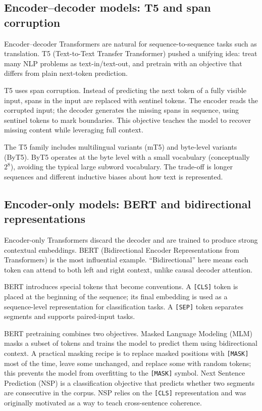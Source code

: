 \subsection{Encoder--decoder models: T5 and span corruption}
Encoder--decoder Transformers are natural for sequence-to-sequence tasks such as translation. T5 (Text-to-Text Transfer Transformer) pushed a unifying idea: treat many NLP problems as text-in/text-out, and pretrain with an objective that differs from plain next-token prediction.

T5 uses span corruption. Instead of predicting the next token of a fully visible input, spans in the input are replaced with sentinel tokens. The encoder reads the corrupted input; the decoder generates the missing spans in sequence, using sentinel tokens to mark boundaries. This objective teaches the model to recover missing content while leveraging full context.

The T5 family includes multilingual variants (mT5) and byte-level variants (ByT5). ByT5 operates at the byte level with a small vocabulary (conceptually \(2^8\)), avoiding the typical large subword vocabulary. The trade-off is longer sequences and different inductive biases about how text is represented.

\subsection{Encoder-only models: BERT and bidirectional representations}
Encoder-only Transformers discard the decoder and are trained to produce strong contextual embeddings. BERT (Bidirectional Encoder Representations from Transformers) is the most influential example. “Bidirectional” here means each token can attend to both left and right context, unlike causal decoder attention.

BERT introduces special tokens that become conventions. A \texttt{[CLS]} token is placed at the beginning of the sequence; its final embedding is used as a sequence-level representation for classification tasks. A \texttt{[SEP]} token separates segments and supports paired-input tasks.

BERT pretraining combines two objectives. Masked Language Modeling (MLM) masks a subset of tokens and trains the model to predict them using bidirectional context. A practical masking recipe is to replace masked positions with \texttt{[MASK]} most of the time, leave some unchanged, and replace some with random tokens; this prevents the model from overfitting to the \texttt{[MASK]} symbol. Next Sentence Prediction (NSP) is a classification objective that predicts whether two segments are consecutive in the corpus. NSP relies on the \texttt{[CLS]} representation and was originally motivated as a way to teach cross-sentence coherence.

